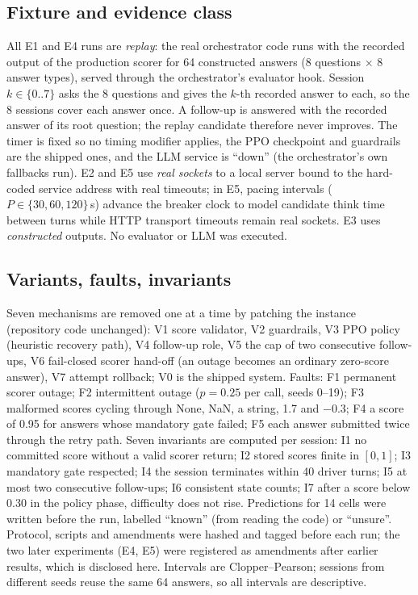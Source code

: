 \documentclass[runningheads]{llncs}
\begin{document}
\subsection{Fixture and evidence class}
All E1 and E4 runs are \emph{replay}: the real orchestrator code runs with the recorded output of the production scorer for 64 constructed answers (8 questions $\times$ 8 answer types), served through the orchestrator's evaluator hook. Session $k\in\{0..7\}$ asks the 8 questions and gives the $k$-th recorded answer to each, so the 8 sessions cover each answer once. A follow-up is answered with the recorded answer of its root question; the replay candidate therefore never improves. The timer is fixed so no timing modifier applies, the PPO checkpoint and guardrails are the shipped ones, and the LLM service is ``down'' (the orchestrator's own fallbacks run). E2 and E5 use \emph{real sockets} to a local server bound to the hard-coded service address with real timeouts; in E5, pacing intervals ($P \in \{30, 60, 120\}$\,s) advance the breaker clock to model candidate think time between turns while HTTP transport timeouts remain real sockets. E3 uses \emph{constructed} outputs. No evaluator or LLM was executed.

\subsection{Variants, faults, invariants}
Seven mechanisms are removed one at a time by patching the instance (repository code unchanged): V1 score validator, V2 guardrails, V3 PPO policy (heuristic recovery path), V4 follow-up role, V5 the cap of two consecutive follow-ups, V6 fail-closed scorer hand-off (an outage becomes an ordinary zero-score answer), V7 attempt rollback; V0 is the shipped system. Faults: F1 permanent scorer outage; F2 intermittent outage ($p=0.25$ per call, seeds 0--19); F3 malformed scores cycling through None, NaN, a string, 1.7 and $-0.3$; F4 a score of 0.95 for answers whose mandatory gate failed; F5 each answer submitted twice through the retry path. Seven invariants are computed per session: I1 no committed score without a valid scorer return; I2 stored scores finite in $[0,1]$; I3 mandatory gate respected; I4 the session terminates within 40 driver turns; I5 at most two consecutive follow-ups; I6 consistent state counts; I7 after a score below 0.30 in the policy phase, difficulty does not rise. Predictions for 14 cells were written before the run, labelled ``known'' (from reading the code) or ``unsure''. Protocol, scripts and amendments were hashed and tagged before each run; the two later experiments (E4, E5) were registered as amendments after earlier results, which is disclosed here. Intervals are Clopper--Pearson; sessions from different seeds reuse the same 64 answers, so all intervals are descriptive.
\end{document}
